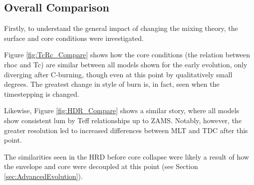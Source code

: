 \subsection{Overall Comparison}
Firstly, to understand the general impact of changing the mixing theory, the surface and core conditions were investigated.

Figure \ref{fig:TcRc_Compare} shows how the core conditions (the relation between \gls{rhoc} and \gls{Tc}) are similar between all models shown for the early evolution, only diverging after C-burning, though even at this point by qualitatively small degrees. The greatest change in style of burn is, in fact, seen when the timestepping is changed.

%

Likewise, Figure \ref{fig:HDR_Compare} shows a similar story, where all models show consistent \gls{lum} by \gls{Teff} relationships 
up to \gls{ZAMS}. Notably, however, the greater resolution led to increased differences between \gls{MLT} and \gls{TDC} after this point.

The similarities seen in the \gls{HRD} before core collapse were likely a result of how the envelope and core were decoupled at this point (see Section \ref{sec:AdvancedEvolution}).
%
